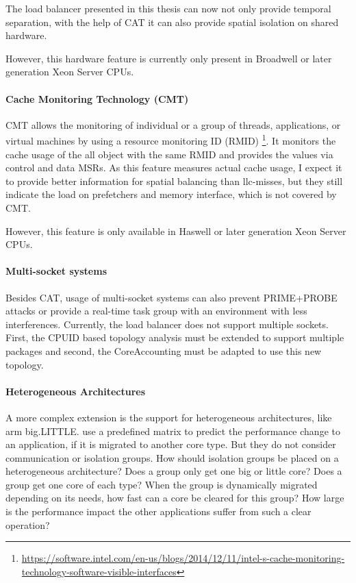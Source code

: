 The load balancer presented in  this thesis can now not only provide temporal
separation, with the help of CAT it can also provide spatial isolation on
shared hardware.

However, this hardware feature is currently only present in Broadwell or later
generation Xeon Server CPUs.

\paragraph{Cache Monitoring Technology (CMT)}
CMT allows the monitoring of individual or a group of threads, applications, or
virtual machines by using a resource monitoring ID (RMID)
\footnote{
  \url{https://software.intel.com/en-us/blogs/2014/12/11/intel-s-cache-monitoring-technology-software-visible-interfaces}}.
It monitors the cache usage of the all object with the same RMID and provides
the values via control and data MSRs.
As this feature measures actual cache usage, I expect it to provide better
information for spatial balancing than \gls{llc}-misses, but they still
indicate the load on prefetchers and memory interface, which is not covered by
CMT.

However, this feature is only available in Haswell or later generation
Xeon Server CPUs.

\paragraph{Multi-socket systems}
Besides CAT, usage of multi-socket systems can also prevent PRIME+PROBE attacks
or provide a real-time task group with an environment with less interferences.
Currently, the load balancer does not support multiple sockets.
First, the CPUID based topology analysis must be extended to support multiple
packages and second, the CoreAccounting must be adapted to use this new
topology.

\paragraph{Heterogeneous Architectures}
A more complex extension is the support for heterogeneous architectures, like
\gls{arm} big.LITTLE.
\citeauthor{sarma_smartbalance_2015} use a predefined matrix to predict the
performance change to an application, if it is migrated to another core type.
But they do not consider communication or isolation groups.
How should isolation groups be placed on a heterogeneous architecture?
Does a group only get one big or little core?
Does a group get one core of each type?
When the group is dynamically migrated depending on its needs, how fast can a
core be cleared for this group?
How large is the performance impact the other applications suffer from such a
clear operation?

